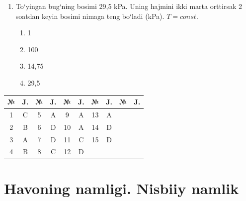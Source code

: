 \begin{enumerate}
\item To‘yingan bug‘ning bosimi 29,5 kPa. Uning hajmini ikki marta orttirsak 2 soatdan keyin bosimi nimaga teng bo‘ladi (kPa). $T = const$.
\begin{enumerate}[label=\Alph*)]
\item 1
\item 100
\item 14,75
\item 29,5
\end{enumerate}

\end{enumerate}



\begin{table}[h!]
\centering
\begin{tabular}{|c|c|c|c|c|c|c|c|c|c|}
\hline
№ & J. & № & J. & № & J. & № & J. & № & J. \\ \hline
1 & C & 5 & A & 9 & A & 13 & A & & \\ \hline
2 & B & 6 & D & 10 & A & 14 & D & & \\ \hline
3 & A & 7 & D & 11 & C & 15 & D & & \\ \hline
4 & B & 8 & C & 12 & D &  &  & & \\ \hline
\end{tabular}
\end{table}



\section{Havoning namligi. Nisbiiy namlik}


